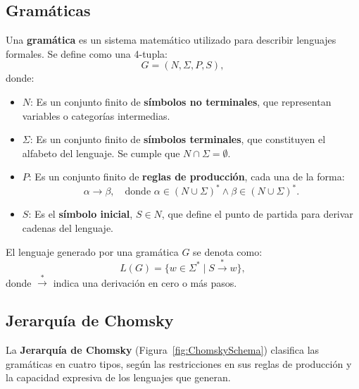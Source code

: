 \documentclass{article}
\begin{document}
\subsection{Gramáticas}

Una \textbf{gramática} es un sistema matemático utilizado para describir lenguajes formales. Se define como una 4-tupla:
\[
      G = (N, \Sigma, P, S),
\]
donde:
\begin{itemize}
      \item \(N\): Es un conjunto finito de \textbf{símbolos no terminales}, que representan variables o categorías intermedias.
      \item \(\Sigma\): Es un conjunto finito de \textbf{símbolos terminales}, que constituyen el alfabeto del lenguaje. Se cumple que \(N \cap \Sigma = \emptyset\).
      \item \(P\): Es un conjunto finito de \textbf{reglas de producción}, cada una de la forma:
            \[
                  \alpha \to \beta, \quad \text{donde } \alpha \in (N \cup \Sigma)^* \wedge \beta \in (N \cup \Sigma)^*.
            \]
      \item \(S\): Es el \textbf{símbolo inicial}, \(S \in N\), que define el punto de partida para derivar cadenas del lenguaje.
\end{itemize}

El lenguaje generado por una gramática \(G\) se denota como:
\[
      L(G) = \{ w \in \Sigma^* \mid S \overset{*}{\to} w \},
\]
donde \(\overset{*}{\to}\) indica una derivación en cero o más pasos.

\subsection{Jerarquía de Chomsky}

La \textbf{Jerarquía de Chomsky} (Figura~\ref{fig:ChomskySchema}) clasifica las gramáticas en cuatro tipos, según las restricciones en sus reglas de producción y la capacidad expresiva de los lenguajes que generan.
\end{document}
